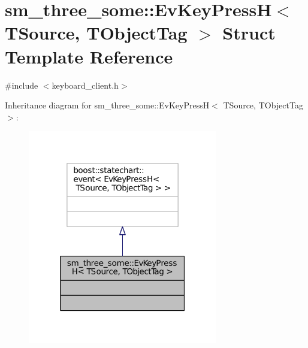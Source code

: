 \hypertarget{structsm__three__some_1_1EvKeyPressH}{}\section{sm\+\_\+three\+\_\+some\+:\+:Ev\+Key\+PressH$<$ T\+Source, T\+Object\+Tag $>$ Struct Template Reference}
\label{structsm__three__some_1_1EvKeyPressH}


{\ttfamily \#include $<$keyboard\+\_\+client.\+h$>$}



Inheritance diagram for sm\+\_\+three\+\_\+some\+:\+:Ev\+Key\+PressH$<$ T\+Source, T\+Object\+Tag $>$\+:
\nopagebreak
\begin{figure}[H]
\begin{center}
\leavevmode
\includegraphics[width=235pt]{structsm__three__some_1_1EvKeyPressH__inherit__graph}
\end{center}
\end{figure}


